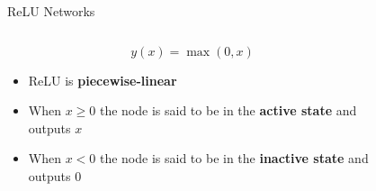 \documentclass[10pt]{beamer}
\begin{document}
\begin{frame}{ReLU Networks}


\begin{columns}

	\begin{column}{0.45\textwidth}
	\begin{large}
	\[
	y(x) = \max(0,x)
	\]
	\end{large}

	\begin{itemize}
        \item ReLU is {\bf piecewise-linear}
        \item When $x \geq 0$ the node is said to be in the { \bf active
			state}
			and outputs $x$

        \item When $x < 0$ the node is said to be in the {\bf inactive state}
			and outputs $0$
	\end{itemize}
\end{column}
\begin{column}{0.5\textwidth}

    \begin{figure}
        \end{figure}

\end{column}
\end{columns}

\end{frame}

\end{document}
